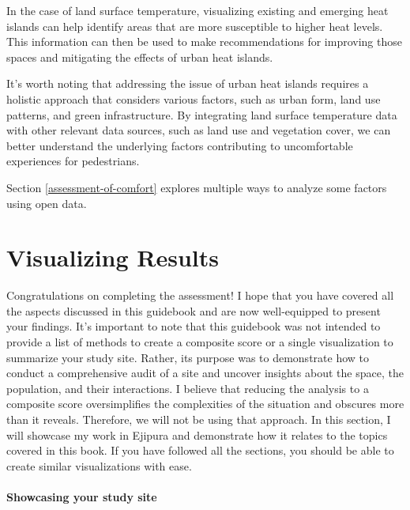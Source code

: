 \documentclass[
]{latex/krantz}
\begin{document}
In the case of land surface temperature, visualizing existing and emerging heat islands can help identify areas that are more susceptible to higher heat levels. This information can then be used to make recommendations for improving those spaces and mitigating the effects of urban heat islands.

It's worth noting that addressing the issue of urban heat islands requires a holistic approach that considers various factors, such as urban form, land use patterns, and green infrastructure. By integrating land surface temperature data with other relevant data sources, such as land use and vegetation cover, we can better understand the underlying factors contributing to uncomfortable experiences for pedestrians.

Section \ref{assessment-of-comfort} explores multiple ways to analyze some factors using open data.

\hypertarget{part-visualizing-results}{%
\part{Visualizing Results}\label{part-visualizing-results}}

Congratulations on completing the assessment! I hope that you have covered all the aspects discussed in this guidebook and are now well-equipped to present your findings. It's important to note that this guidebook was not intended to provide a list of methods to create a composite score or a single visualization to summarize your study site. Rather, its purpose was to demonstrate how to conduct a comprehensive audit of a site and uncover insights about the space, the population, and their interactions. I believe that reducing the analysis to a composite score oversimplifies the complexities of the situation and obscures more than it reveals. Therefore, we will not be using that approach. In this section, I will showcase my work in Ejipura and demonstrate how it relates to the topics covered in this book. If you have followed all the sections, you should be able to create similar visualizations with ease.

\hypertarget{showcase-site}{%
\subsection{Showcasing your study site}\label{showcase-site}}
\end{document}
